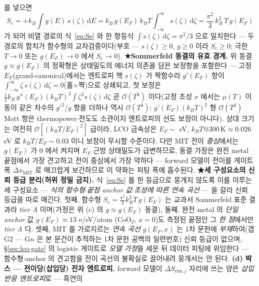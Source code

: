 \documentclass[11pt,a4paper]{article}
\newcommand{\dd}{\mathrm{d}}
\newcommand{\rxn}{\mathrm{rxn}}
\begin{document}
를 넣으면
\begin{equation}
S_e=+k_B\int g(E)\,s(\zeta)\,\dd E
=k_B\,g(E_F)\,k_BT\!\int_{-\infty}^{\infty}\!s(\zeta)\,\dd\zeta
=\frac{\pi^2}{3}\,k_B^2\,T\,g(E_F)
\label{eq:Sedirect}
\end{equation}
가 되어 비열 경로의 식~\eqref{eq:Se} 와 한 항등식 $\int s(\zeta)\,\dd\zeta=\pi^2/3$ 으로 일치한다 — 두 경로의
합치가 함수형의 교차검증이다(부호 — $s(\zeta)\ge0$, $g\ge0$ 이라 $S_e\ge0$; 극한 $T\to0$ 또는 $g(E_F)\to0$ 에서
$S_e\to0$).
\textbf{★Sommerfeld 동결의 유효 경계.} 위 동결 $g\approx g(E_F)$ 의 정확형은 상태밀도의 에너지 의존을 담은 보정항을
포함한다 --- 고정 $E_F$(grand-canonical)에서는 엔트로피 핵 $s(\zeta)$ 가 짝함수라 $g'(E_F)$ 항이 $\int_{-\infty}^{\infty}\!\zeta\,s(\zeta)\,\dd\zeta=0$(홀$\times$짝)으로
상쇄되고, 첫 보정은 $\tfrac12 k_B\,g''(E_F)(k_BT)^3\!\int\zeta^2 s(\zeta)\,\dd\zeta$ 곧 $\mathcal O(T^3)$ 이다(고정 조성 $x$ 에서는
$\mu(T)$ 이동이 같은 차수의 $g'^2/g$ 항을 더하나 역시 $\mathcal O(T^3)$; $g'(E_F)(k_BT)^2$ 형 $\mathcal O(T^2)$ Mott 항은
thermopower$\cdot$전도도 소관이지 엔트로피의 선도 보정이 아니다). 상대 크기는 여전히 $\mathcal O[(k_BT/E_F)^2]$ 급이라,
LCO 금속상은 $E_F\sim$ eV, $k_BT@300\,\mathrm K\approx0.026$ eV 로 $k_BT/E_F\sim0.03$ 이니 보정이 무시할 수준이다. 다만 MIT 전이 \emph{중심}에서는 $g(E_F)$
가 0 에서 켜지며 $E_F$ 근방 상태밀도가 급변하므로, 동결 가정은 완전 metal 끝점에서 가장 견고하고 전이 중심에서
가장 약하다 — forward 모델이 전이를 게이트 폭 $\Delta x_\mathrm{MIT}$ 로 매끄럽게 보간하므로 이 약화는 피팅 폭에
흡수된다. \textbf{★세 구성요소의 신뢰 등급 분리(허위 정밀 금지).}
식~\eqref{eq:Se} 를 한 등급으로 뭉개지 않도록 이를 이루는 세 구성요소 — \emph{식의 함수형}$\cdot$\emph{끝점
anchor 값}$\cdot$\emph{조성에 따른 연속 곡선} — 을 갈라 신뢰 등급을 따로 매긴다. 첫째, 함수형
$S_e=\tfrac{\pi^2}{3}k_B^2T\,g(E_F)$ 는 교과서 Sommerfeld 표준 결과라 \emph{tier A} 이며(가정은 위 (c) 의
$g\!\approx\!g(E_F)$ 동결), 둘째, 완전 metal 의 \emph{단일 anchor} 값 $g(E_F)\!\approx\!13$ e/eV/atom
($\mathrm{CoO_2}$, $x{=}0$)도 측정된 끝점인 그 \emph{한 점}에서만 \emph{tier A} 다\cite{motohashi2009}. 셋째,
MIT 를 가로지르는 \emph{연속 곡선} $g(E_F,x)$ 는 1차 문헌에 \emph{부재}하여(갭 G2 — G$n$ 은 본 문건이
추적하는 1차 문헌 공백의 일련번호) 신뢰 등급이 없으며,
\S\ref{sec:lco-gate} 의 logistic 게이트로 \emph{모델 가정}을 세운 뒤 데이터 피팅에 위임한다 — 함수형$\cdot$anchor
의 견고함을 전이 곡선의 불확실로 끌어내려 뭉개서는 안 된다. \textbf{(d) 박스 — 전이당(삽입당) 전자 엔트로피.} forward 모델이 $\Delta S_{\rxn,j}$ 자리에 쓰는 양은 \emph{삽입 반응 엔트로피}로 — 흑연의
\end{document}
